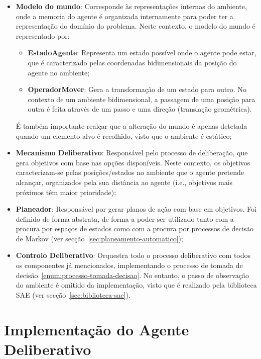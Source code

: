 \begin{itemize}
    \item \textbf{Modelo do mundo}: Corresponde às representações internas do ambiente, onde a memoria do agente é organizada internamente para poder ter a representação do domínio do problema.
    Neste contexto, o modelo do mundo é representado por:
    \begin{itemize}
        \item \textbf{EstadoAgente}: Representa um estado possível onde o agente pode estar, que é
        caracterizado pelas coordenadas bidimensionais da posição do agente no ambiente;
        \item \textbf{OperadorMover}: Gera a transformação de um estado para outro.
        No contexto de um ambiente bidimensional, a passagem de uma posição para outra é feita através de um passo e uma direção (translação geométrica).
    \end{itemize}
    É também importante realçar que a alteração do mundo é apenas detetada quando um elemento alvo é recolhido, visto que o ambiente é estático;
    \item \textbf{Mecanismo Deliberativo}: Responsável pelo processo de deliberação, que gera objetivos com base nas opções disponíveis.
    Neste contexto, os objetivos caracterizam-se pelas posições/estados no ambiente que o agente pretende alcançar, organizados pela sua distância ao agente (i.e., objetivos mais próximos têm maior prioridade);
    \item \textbf{Planeador}: Responsável por gerar planos de ação com base em objetivos.
    Foi definido de forma abstrata, de forma a poder ser utilizado tanto com a procura por espaços de estados como com a procura por processos de decisão de Markov (ver secção~\ref{sec:planeamento-automatico});
    \item \textbf{Controlo Deliberativo}: Orquestra todo o processo deliberativo com todos os componentes já mencionados, implementando o processo de tomada de decisão~\ref{enum:processo-tomada-decisao}.
    No entanto, o passo de observação do ambiente é omitido da implementação, visto que é realizado pela biblioteca SAE (ver secção~\ref{sec:biblioteca-sae}).
\end{itemize}


\section{Implementação do Agente Deliberativo}\label{sec:implementacao-agente-deliberativo}

